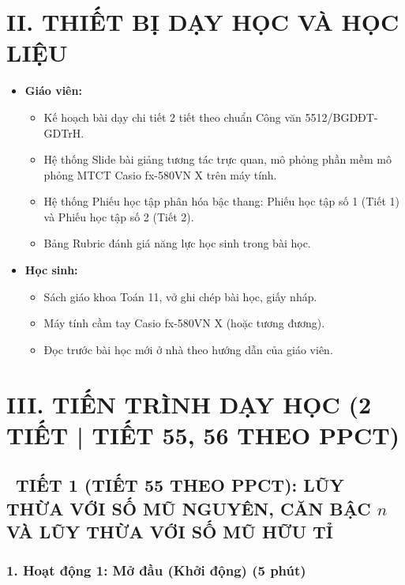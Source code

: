 \documentclass[12pt, a4paper]{article}
\begin{document}
\vspace{5pt}

\section*{II. THIẾT BỊ DẠY HỌC VÀ HỌC LIỆU}

\begin{itemize}[leftmargin=1.2cm]
    \item \textbf{Giáo viên:}
    \begin{itemize}[leftmargin=0.6cm]
        \item Kế hoạch bài dạy chi tiết 2 tiết theo chuẩn Công văn 5512/BGDĐT-GDTrH.
        \item Hệ thống Slide bài giảng tương tác trực quan, mô phỏng phần mềm mô phỏng MTCT Casio fx-580VN X trên máy tính.
        \item Hệ thống Phiếu học tập phân hóa bậc thang: Phiếu học tập số 1 (Tiết 1) và Phiếu học tập số 2 (Tiết 2).
        \item Bảng Rubric đánh giá năng lực học sinh trong bài học.
    \end{itemize}
    \item \textbf{Học sinh:}
    \begin{itemize}[leftmargin=0.6cm]
        \item Sách giáo khoa Toán 11, vở ghi chép bài học, giấy nháp.
        \item Máy tính cầm tay Casio fx-580VN X (hoặc tương đương).
        \item Đọc trước bài học mới ở nhà theo hướng dẫn của giáo viên.
    \end{itemize}
\end{itemize}

\vspace{5pt}

\section*{III. TIẾN TRÌNH DẠY HỌC (2 TIẾT | TIẾT 55, 56 THEO PPCT)}

\subsection*{\faClockO \ TIẾT 1 (TIẾT 55 THEO PPCT): LŨY THỪA VỚI SỐ MŨ NGUYÊN, CĂN BẬC $n$ VÀ LŨY THỪA VỚI SỐ MŨ HỮU TỈ}

\subsubsection*{1. Hoạt động 1: Mở đầu (Khởi động) (5 phút)}
\end{document}
